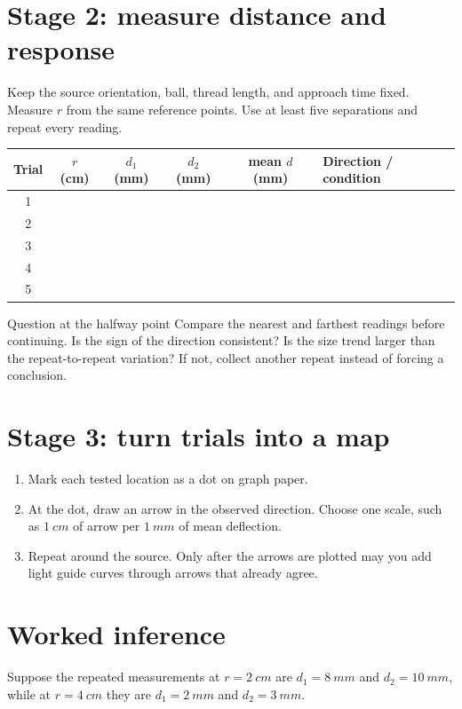 \section{Stage 2: measure distance and response}
Keep the source orientation, ball, thread length, and approach time fixed.
Measure \(r\) from the same reference points. Use at least five separations and
repeat every reading.

\begin{center}\small
\begin{tabularx}{.94\linewidth}{@{}c c c c c L@{}}
\toprule
Trial & \(r\) (cm) & \(d_1\) (mm) & \(d_2\) (mm) & mean \(d\) (mm) & Direction / condition\\
 & & & & &\\[.8em]
2 & & & & &\\[.8em]
3 & & & & &\\[.8em]
4 & & & & &\\[.8em]
5 & & & & &\\
\bottomrule
\end{tabularx}
\end{center}

\begin{telospanel}{Question at the halfway point}
Compare the nearest and farthest readings before continuing. Is the sign of
the direction consistent? Is the size trend larger than the repeat-to-repeat
variation? If not, collect another repeat instead of forcing a conclusion.
\end{telospanel}

\section{Stage 3: turn trials into a map}
\begin{enumerate}
\item Mark each tested location as a dot on graph paper.
\item At the dot, draw an arrow in the observed direction. Choose one scale,
such as \(\qty{1}{cm}\) of arrow per \(\qty{1}{mm}\) of mean deflection.
\item Repeat around the source. Only after the arrows are plotted may you add
light guide curves through arrows that already agree.
\end{enumerate}

\fieldcomparison

\newpage
{}
\small
\section{Worked inference}
Suppose the repeated measurements at \(r=\qty{2}{cm}\) are \(d_1=\qty{8}{mm}\)
and \(d_2=\qty{10}{mm}\), while at \(r=\qty{4}{cm}\) they are
\(d_1=\qty{2}{mm}\) and \(d_2=\qty{3}{mm}\).

